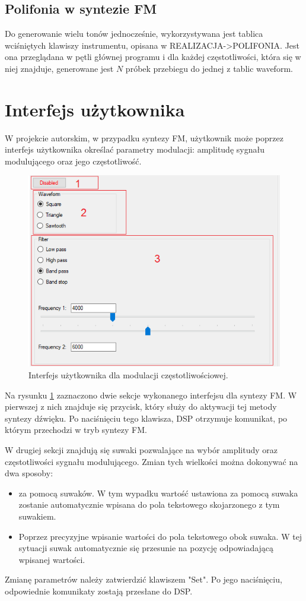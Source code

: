 \subsection{Polifonia w syntezie FM}
Do generowanie wielu tonów jednocześnie, wykorzystywana jest tablica wciśniętych klawiszy instrumentu, opisana w REALIZACJA->POLIFONIA. Jest ona przeglądana w pętli głównej programu i dla każdej częstotliwości, która się w niej znajduje, generowane jest $N$ próbek przebiegu do jednej z tablic waveform.

\section{Interfejs użytkownika}
W projekcie autorskim, w przypadku syntezy FM, użytkownik może poprzez interfejs użytkownika określać parametry modulacji: amplitudę sygnału modulującego oraz jego częstotliwość.
\begin{figure}[H]
	\centering
	\includegraphics[width=12cm]{grafiki/sub_interface}
	\captionsetup{justification=centering}
	\caption{Interfejs użytkownika dla modulacji częstotliwościowej.}
	\label{rys:fm_interface}
\end{figure}
Na rysunku \ref{rys:fm_interface} zaznaczono dwie sekcje wykonanego interfejsu dla syntezy FM. W pierwszej z nich znajduje się przycisk, który służy do aktywacji tej metody syntezy dźwięku. Po naciśnięciu tego klawisza, DSP otrzymuje komunikat, po którym przechodzi w tryb syntezy FM.

W drugiej sekcji znajdują się suwaki pozwalające na wybór amplitudy oraz częstotliwości sygnału modulującego. Zmian tych wielkości można dokonywać na dwa sposoby:
\begin{itemize}
	\item za pomocą suwaków. W tym wypadku wartość ustawiona za pomocą suwaka zostanie automatycznie wpisana do pola tekstowego skojarzonego z tym suwakiem.
	\item Poprzez precyzyjne wpisanie wartości do pola tekstowego obok suwaka. W tej sytuacji suwak automatycznie się przesunie na pozycję odpowiadającą wpisanej wartości.
\end{itemize}
Zmianę parametrów należy zatwierdzić klawiszem "Set". Po jego naciśnięciu, odpowiednie komunikaty zostają przesłane do DSP.
